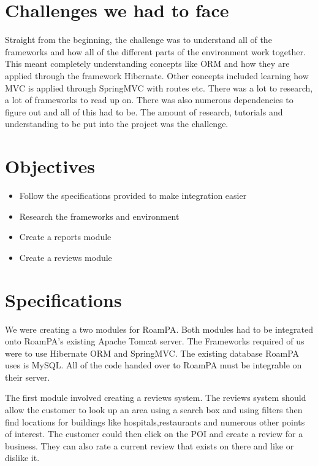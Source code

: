 \section{Challenges we had to face}    

Straight from the beginning, the challenge was to understand all of the frameworks and how all of the different parts of the environment work together. This meant completely understanding concepts like ORM and how they are applied through the framework Hibernate. Other concepts included learning how MVC is applied through SpringMVC with routes etc. There was a lot to research, a lot of frameworks to read up on. There was also numerous dependencies to figure out and all of this had to be. The amount of research, tutorials and understanding to be put into the project was the challenge. 


\section{Objectives}

\begin{itemize}
\item{Follow the specifications provided to make integration easier}
\item{Research the frameworks and environment}
\item{Create a reports module}
\item{Create a reviews module}
\end{itemize}

\section{Specifications}

We were creating a two modules for RoamPA. Both modules had to be integrated onto RoamPA's existing Apache Tomcat server. The Frameworks required of us were to use Hibernate ORM and SpringMVC. The existing database RoamPA uses is MySQL. All of the code handed over to RoamPA must be integrable on their server.

The first module involved creating a reviews system. The reviews system should allow the customer to look up an area using a search box and using filters then find locations for buildings like hospitals,restaurants and numerous other points of interest. The customer could then click on the POI and create a review for a business. They can also rate a current review that exists on there and like or dislike it.

